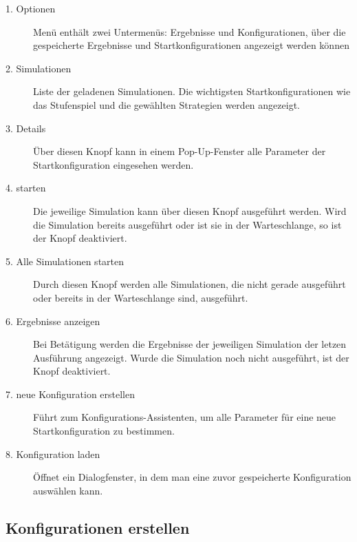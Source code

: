 \begin{description}


\item[1. Optionen] Menü enthält zwei Untermenüs: Ergebnisse und Konfigurationen, über die gespeicherte Ergebnisse und Startkonfigurationen angezeigt werden können

\item[2. Simulationen] Liste der geladenen Simulationen. Die wichtigsten Startkonfigurationen wie das Stufenspiel und die gewählten Strategien werden angezeigt.

\item[3. Details] Über diesen Knopf kann in einem Pop-Up-Fenster alle Parameter der Startkonfiguration eingesehen werden.

\item[4. starten] Die jeweilige Simulation kann über diesen Knopf ausgeführt werden. Wird die Simulation bereits ausgeführt oder ist sie in der Warteschlange, so ist der Knopf deaktiviert.

\item[5. Alle Simulationen starten] Durch diesen Knopf werden alle Simulationen, die nicht gerade ausgeführt oder bereits in der Warteschlange sind, ausgeführt. 

\item[6. Ergebnisse anzeigen] Bei Betätigung werden die Ergebnisse der jeweiligen Simulation der letzen Ausführung angezeigt. Wurde die Simulation noch nicht ausgeführt, ist der Knopf deaktiviert.

\item[7. neue Konfiguration erstellen] Führt zum Konfigurations-Assistenten, um alle Parameter für eine neue Startkonfiguration zu bestimmen.

\item[8. Konfiguration laden] Öffnet ein Dialogfenster, in dem man eine zuvor gespeicherte Konfiguration auswählen kann.

\end{description}


\subsection{Konfigurationen erstellen}

